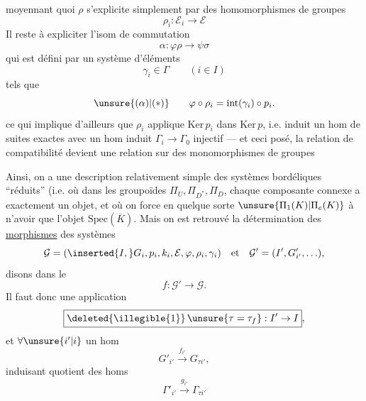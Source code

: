 
moyennant quoi $\rho$ s'explicite simplement par des
homomorphismes de groupes
\[
\boxed{\rho_i:\mathcal E_i\longrightarrow\mathcal E}
\]
Il reste à expliciter l'isom de commutation
\[
\alpha:\varphi\rho\to\psi\sigma
\]
qui est défini par un système d'éléments
\[
\boxed{\gamma_i\in\Gamma\qquad(i\in I)}
\]
tels que
\[
\unsure{(\alpha)|(*)}\qquad
\varphi\circ\rho_i=\mathrm{int}(\gamma_i)\circ p_i.
\]
ce qui implique d'ailleurs que $\rho_i$ 
applique $\mathrm{Ker}\,p_i$ dans $\mathrm{Ker}\,p$, i.e. induit
un hom de suites exactes
avec un hom induit $\Gamma_i\to\Gamma_0$ injectif
--- et ceci posé, la relation de compatibilité
\unsure{$(\alpha)$|$(*)$} devient une relation sur des
monomorphismes de groupes



Ainsi, on a une description relativement simple des systèmes
bordéliques ``réduits'' (i.e. où dans les groupoïdes
$\Pi_U,\Pi_{D^*},\Pi_D$, chaque composante connexe a exactement
un objet, et où  on force en quelque sorte
$\unsure{\Pi_1(K)|\Pi_e(K)}$ à n'avoir que l'objet
$\mathrm{Spec}(\overline K)$.
Mais on est retrouvé 
 la détermination des \uline{morphismes} des systèmes
\[
\mathcal G=(\inserted{I,}G_i,p_i,k_i,\mathcal E,\varphi,\rho_i,
\gamma_i)
\quad\hbox{et}\quad
\mathcal G'=(I',G'_{i'},\ldots),
\]
 disons dans le 
\[
f:\mathcal G'\to\mathcal G.
\]
Il faut donc  une application
\[
\boxed{\deleted{\illegible{1}}\,\unsure{\tau=\tau_f}:I'\to I},
\]
et $\forall\unsure{i'|i}$ un hom
\[
\boxed{G'_{i'}\xrightarrow{f_{i'}}G_{\tau i'}},
\]
induisant  quotient des homs
\[
\Gamma'_{i'}\xrightarrow{g_{i'}}\Gamma_{\tau i'}
\]

